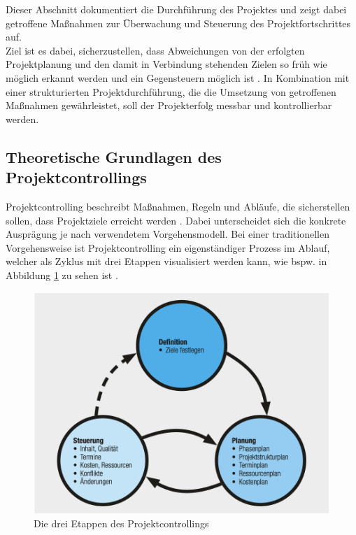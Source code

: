 \documentclass[ThesisDJ.tex]{subfiles}
\begin{document}
    Dieser Abschnitt dokumentiert die Durchführung des Projektes und zeigt dabei getroffene Maßnahmen zur Überwachung und Steuerung des Projektfortschrittes auf.\\
    Ziel ist es dabei, sicherzustellen, dass Abweichungen von der erfolgten Projektplanung und den damit in Verbindung stehenden Zielen so früh wie möglich erkannt 
    werden und ein Gegensteuern möglich ist \cite[S.~55ff]{riedl_management_2019}. In Kombination mit einer strukturierten Projektdurchführung, die die Umsetzung von 
    getroffenen Maßnahmen gewährleistet, soll der Projekterfolg messbar und kontrollierbar werden.

    \subsection{Theoretische Grundlagen des Projektcontrollings}
    Projektcontrolling beschreibt Maßnahmen, Regeln und Abläufe, die sicherstellen sollen, dass Projektziele
    erreicht werden \cite{kerzner_project_2022} \cite[S.~189]{kuster_handbuch_2022}. Dabei unterscheidet sich die konkrete Ausprägung 
    je nach verwendetem Vorgehensmodell. Bei einer traditionellen Vorgehensweise ist Projektcontrolling ein eigenständiger Prozess im Ablauf, welcher
    als Zyklus mit drei Etappen visualisiert werden kann, wie bspw. in Abbildung \ref{fig:controlling} zu sehen ist \cite[S.~191]{kuster_handbuch_2022}.

    \begin{figure}
        \includegraphics[scale=0.8]{controlling.png}
        \centering
        \caption{Die drei Etappen des Projektcontrollings}
        \label{fig:controlling}
    \end{figure}
\end{document}
